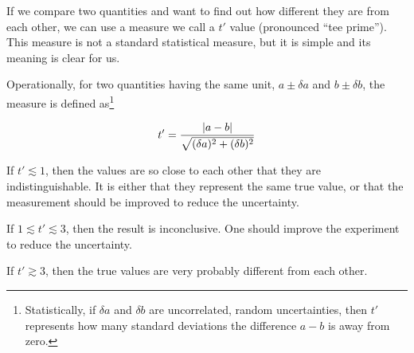 If we compare two quantities and want to find out how different they are from each other, we can use a measure we call a $t'$ value (pronounced ``tee prime''). This measure is not a standard statistical measure, but it is simple and its meaning is clear for us.

Operationally, for two quantities having the same unit, $a \pm \delta a$ and $b \pm \delta b$, the measure is defined as\footnote{Statistically, if $\delta a$ and $\delta b$ are uncorrelated, random uncertainties, then $t'$ represents how many standard deviations the difference $a - b$ is away from zero.}

\begin{equation}
t' = \frac{\left\lvert a-b\right\rvert}{\sqrt{(\delta a)^2 + (\delta b)^2}}
\end{equation}

If $t' \lesssim 1$, then the values are so close to each other that they are indistinguishable. It is either that they represent the same true value, or that the measurement should be improved to reduce the uncertainty.

If $1 \lesssim t' \lesssim 3$, then the result is inconclusive. One should improve the experiment to reduce the uncertainty.

If $t' \gtrsim 3$, then the true values are very probably different from each other.